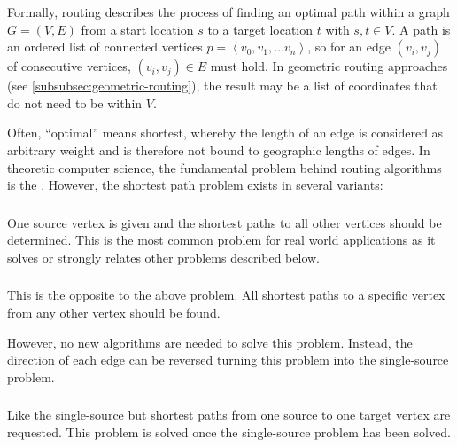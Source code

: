 		Formally, routing describes the process of finding an optimal path within a graph $G=(V, E)$ from a start location $s$ to a target location $t$ with $s, t \in V$.
		A path is an ordered list of connected vertices $p=\left\langle v_0, v_1, \dots v_n \right\rangle$, so for an edge $(v_i, v_j)$ of consecutive vertices, $(v_i, v_j) \in E$ must hold.
		In geometric routing approaches (see \cref{subsubsec:geometric-routing}), the result may be a list of coordinates that do not need to be within $V$.
		
		Often, \enquote{optimal} means shortest, whereby the length of an edge is considered as arbitrary weight and is therefore not bound to geographic lengths of edges.
		In theoretic computer science, the fundamental problem behind routing algorithms is the .
		However, the shortest path problem exists in several variants\cite[644]{cormen-introduction-to-alg}:
		
		\subsubsection{}
		
			One source vertex is given and the shortest paths to all other vertices should be determined.
			This is the most common problem for real world applications as it solves or strongly relates other problems described below.
			
		
		\subsubsection{}
		
			This is the opposite to the above problem.
			All shortest paths to a specific vertex from any other vertex should be found.
			
			However, no new algorithms are needed to solve this problem.
			Instead, the direction of each edge can be reversed turning this problem into the single-source problem.
		
		\subsubsection{}
		
			Like the single-source but shortest paths from one source to one target vertex are requested.
			This problem is solved once the single-source problem has been solved.
		
